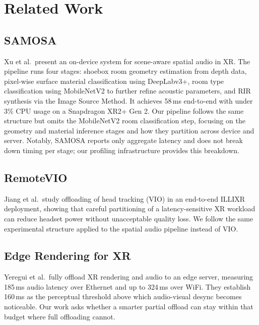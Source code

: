 \documentclass[11pt]{article}
\begin{document}
\section{Related Work}

\subsection{SAMOSA}

Xu et al.\ present an on-device system for scene-aware spatial
audio in XR. The pipeline runs four stages: shoebox room geometry estimation
from depth data, pixel-wise surface material classification using DeepLabv3+,
room type classification using MobileNetV2 to further refine acoustic
parameters, and RIR synthesis via the Image Source Method. It achieves
58\,ms end-to-end with under 3\% CPU usage on a Snapdragon XR2+ Gen 2.
Our pipeline follows the same structure but omits the MobileNetV2 room
classification step, focusing on the geometry and material inference stages
and how they partition across device and server. Notably, SAMOSA reports
only aggregate latency and does not break down timing per stage; our
profiling infrastructure provides this breakdown.

\subsection{RemoteVIO}

Jiang et al.\ study offloading of head tracking (VIO) in an
end-to-end ILLIXR deployment, showing that careful partitioning of a
latency-sensitive XR workload can reduce headset power without unacceptable
quality loss. We follow the same experimental structure
applied to the spatial audio pipeline instead of VIO.

\subsection{Edge Rendering for XR}

Yeregui et al.\ fully offload XR rendering and audio to an edge
server, measuring 185\,ms audio latency over Ethernet and up to 324\,ms
over WiFi. They establish 160\,ms as the perceptual threshold above which
audio-visual desync becomes noticeable. Our work asks whether a smarter
partial offload can stay within that budget where full offloading cannot.

\end{document}
